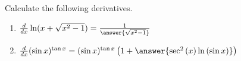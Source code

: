 \documentclass{ximera}
\author{Nela Lakos}
\begin{document}
\begin{exercise}

Calculate the following derivatives.
\begin{enumerate}
\item $\frac{d}{dx}\ln(x+\sqrt{x^2-1}) =\frac{1}{\answer{\sqrt{x^2-1}}}$\\
\item$ \frac{d}{dx}(\sin x)^{\tan{x}} = (\sin{x})^{\tan{x}}\left(1+\answer{\sec^2{(x)}\ln{(\sin{x})}}\right)$\\
\end{enumerate}
\end{exercise}
\end{document}
